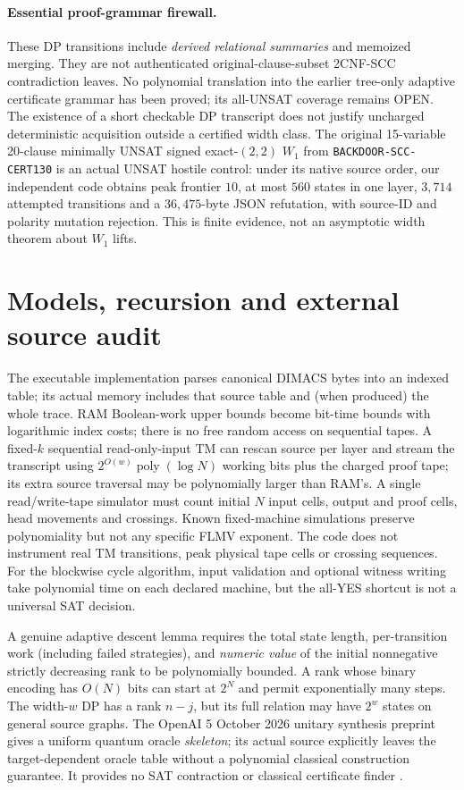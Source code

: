 \documentclass[11pt]{article}
\begin{document}
\paragraph{Essential proof-grammar firewall.}
These DP transitions include \emph{derived relational summaries} and memoized merging. They are not authenticated original-clause-subset 2CNF-SCC contradiction leaves. No polynomial translation into the earlier tree-only adaptive certificate grammar has been proved; its all-UNSAT coverage remains OPEN. The existence of a short checkable DP transcript does not justify uncharged deterministic acquisition outside a certified width class. The original 15-variable 20-clause minimally UNSAT signed exact-$(2,2)$ $W_1$ from \texttt{BACKDOOR-SCC-CERT130} is an actual UNSAT hostile control: under its native source order, our independent code obtains peak frontier $10$, at most $560$ states in one layer, $3,714$ attempted transitions and a $36,475$-byte JSON refutation, with source-ID and polarity mutation rejection. This is finite evidence, not an asymptotic width theorem about $W_1$ lifts.

\section{Models, recursion and external source audit}
The executable implementation parses canonical DIMACS bytes into an indexed table; its actual memory includes that source table and (when produced) the whole trace. RAM Boolean-work upper bounds become bit-time bounds with logarithmic index costs; there is no free random access on sequential tapes. A fixed-$k$ sequential read-only-input TM can rescan source per layer and stream the transcript using $2^{O(w)}\operatorname{poly}(\log N)$ working bits plus the charged proof tape; its extra source traversal may be polynomially larger than RAM's. A single read/write-tape simulator must count initial $N$ input cells, output and proof cells, head movements and crossings. Known fixed-machine simulations preserve polynomiality but not any specific FLMV exponent. The code does not instrument real TM transitions, peak physical tape cells or crossing sequences. For the blockwise cycle algorithm, input validation and optional witness writing take polynomial time on each declared machine, but the all-YES shortcut is not a universal SAT decision.

A genuine adaptive descent lemma requires the total state length, per-transition work (including failed strategies), and \emph{numeric value} of the initial nonnegative strictly decreasing rank to be polynomially bounded. A rank whose binary encoding has $O(N)$ bits can start at $2^N$ and permit exponentially many steps. The width-$w$ DP has a rank $n-j$, but its full relation may have $2^w$ states on general source graphs. The OpenAI 5 October 2026 unitary synthesis preprint gives a uniform quantum oracle \emph{skeleton}; its actual source explicitly leaves the target-dependent oracle table without a polynomial classical construction guarantee. It provides no SAT contraction or classical certificate finder \cite{oai}.
\end{document}
